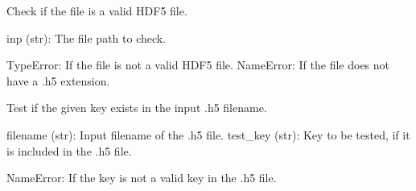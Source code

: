 \documentclass[letterpaper,10pt,english]{sphinxmanual}
\begin{document}
\begin{fulllineitems}

\begin{fulllineitems}
\label{\detokenize{cometr.global_metrics:cometr.global_metrics.MSE.MSE.is_h5py_file}}
\pysigstartsignatures
{}
\pysigstopsignatures
\sphinxAtStartPar
Check if the file is a valid HDF5 file.
\begin{description}
\sphinxAtStartPar
inp (str): The file path to check.

\sphinxAtStartPar
TypeError: If the file is not a valid HDF5 file.
NameError: If the file does not have a .h5 extension.

\end{description}

\end{fulllineitems}


\begin{fulllineitems}
\label{\detokenize{cometr.global_metrics:cometr.global_metrics.MSE.MSE.is_key_valid}}
\pysigstartsignatures
{}
\pysigstopsignatures
\sphinxAtStartPar
Test if the given key exists in the input .h5 filename.
\begin{description}
\sphinxAtStartPar
filename (str): Input filename of the .h5 file.
test\_key (str): Key to be tested, if it is included in the .h5 file.

\sphinxAtStartPar
NameError: If the key is not a valid key in the .h5 file.

\end{description}

\end{fulllineitems}


\end{fulllineitems}
\end{document}
